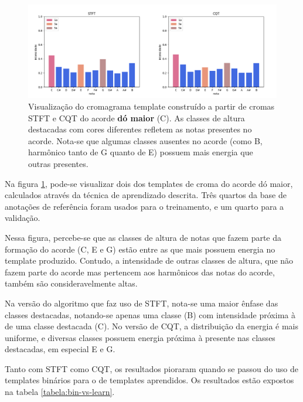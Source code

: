         \begin{figure}[h]
        \begin{center}
            \includegraphics[width=16cm]{figuras/mayor_C.png}   
            \caption{\label{fig:exp:template_c}Visualização do cromagrama template construído a partir de cromas STFT e CQT do acorde \textbf{dó maior} (C). As classes de altura destacadas com cores diferentes refletem as notas presentes no acorde. Nota-se que algumas classes ausentes no acorde (como B, harmônico tanto de G quanto de E) possuem mais energia que outras presentes.}
        \end{center}
        \end{figure}
        
        Na figura \ref{fig:exp:template_c}, pode-se visualizar dois dos templates de croma do acorde dó maior, calculados através da técnica de aprendizado descrita. Três quartos da base de anotações de referência foram usados para o treinamento, e um quarto para a validação.
        
        Nessa figura, percebe-se que as classes de altura de notas que fazem parte da formação do acorde (C, E e G) estão entre as que mais possuem energia no template produzido. Contudo, a intensidade de outras classes de altura, que não fazem parte do acorde mas pertencem aos harmônicos das notas do acorde, também são consideravelmente altas.
        
        Na versão do algoritmo que faz uso de STFT, nota-se uma maior ênfase das classes destacadas, notando-se apenas uma classe (B) com intensidade próxima à de uma classe destacada (C). No versão de CQT, a distribuição da energia é mais uniforme, e diversas classes possuem energia próxima à presente nas classes destacadas, em especial E e G.

        Tanto com STFT como CQT, os resultados pioraram quando se passou do uso de templates binários para o de templates aprendidos. Os resultados estão expostos na tabela \ref{tabela:bin-vs-learn}.


